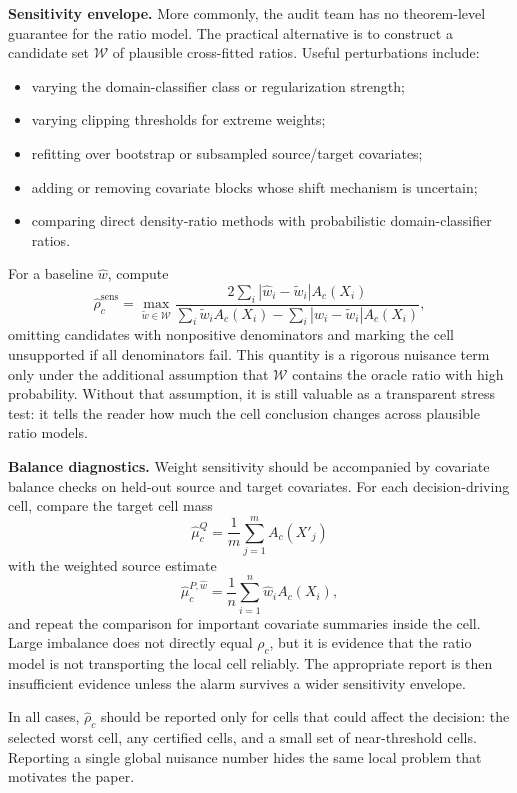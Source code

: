 \textbf{Sensitivity envelope.} More commonly, the audit team has no theorem-level guarantee for the ratio model. The practical alternative is to construct a candidate set \(\mathcal W\) of plausible cross-fitted ratios. Useful perturbations include:
\begin{itemize}
  \item varying the domain-classifier class or regularization strength;
  \item varying clipping thresholds for extreme weights;
  \item refitting over bootstrap or subsampled source/target covariates;
  \item adding or removing covariate blocks whose shift mechanism is uncertain;
  \item comparing direct density-ratio methods with probabilistic domain-classifier ratios.
\end{itemize}
For a baseline \(\widehat w\), compute
\[
\widehat\rho_c^{\mathrm{sens}}
=
\max_{\widetilde w\in\mathcal W}
\frac{
2\sum_i|\widehat w_i-\widetilde w_i|A_c(X_i)
}{
\sum_i\widetilde w_iA_c(X_i)
-
\sum_i|\widehat w_i-\widetilde w_i|A_c(X_i)
},
\]
omitting candidates with nonpositive denominators and marking the cell unsupported if all denominators fail. This quantity is a rigorous nuisance term only under the additional assumption that \(\mathcal W\) contains the oracle ratio with high probability. Without that assumption, it is still valuable as a transparent stress test: it tells the reader how much the cell conclusion changes across plausible ratio models.

\textbf{Balance diagnostics.} Weight sensitivity should be accompanied by covariate balance checks on held-out source and target covariates. For each decision-driving cell, compare the target cell mass
\[
\widehat\mu_c^Q=\frac1m\sum_{j=1}^m A_c(X'_j)
\]
with the weighted source estimate
\[
\widehat\mu_c^{P,\widehat w}
=
\frac1n\sum_{i=1}^n \widehat w_iA_c(X_i),
\]
and repeat the comparison for important covariate summaries inside the cell. Large imbalance does not directly equal \(\rho_c\), but it is evidence that the ratio model is not transporting the local cell reliably. The appropriate report is then insufficient evidence unless the alarm survives a wider sensitivity envelope.

In all cases, \(\widehat\rho_c\) should be reported only for cells that could affect the decision: the selected worst cell, any certified cells, and a small set of near-threshold cells. Reporting a single global nuisance number hides the same local problem that motivates the paper.

